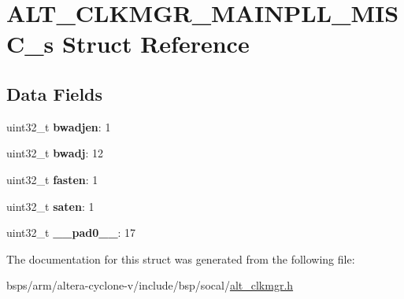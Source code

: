 \hypertarget{structALT__CLKMGR__MAINPLL__MISC__s}{}\section{A\+L\+T\+\_\+\+C\+L\+K\+M\+G\+R\+\_\+\+M\+A\+I\+N\+P\+L\+L\+\_\+\+M\+I\+S\+C\+\_\+s Struct Reference}
\label{structALT__CLKMGR__MAINPLL__MISC__s}
\subsection*{Data Fields}
\begin{DoxyCompactItemize}
\item 
\mbox{\label{structALT__CLKMGR__MAINPLL__MISC__s_af00102158989046b7ea0a47bbb01af68}} 
uint32\+\_\+t {\bfseries bwadjen}\+: 1
\item 
\mbox{\label{structALT__CLKMGR__MAINPLL__MISC__s_a2a95ef518713bbdc9fb0e35145386acd}} 
uint32\+\_\+t {\bfseries bwadj}\+: 12
\item 
\mbox{\label{structALT__CLKMGR__MAINPLL__MISC__s_a439807e43c377d436dc0ac96a2e34241}} 
uint32\+\_\+t {\bfseries fasten}\+: 1
\item 
\mbox{\label{structALT__CLKMGR__MAINPLL__MISC__s_aa76edaf98522bcc3795a1b8eb99ee1af}} 
uint32\+\_\+t {\bfseries saten}\+: 1
\item 
\mbox{\label{structALT__CLKMGR__MAINPLL__MISC__s_a9f8c4c25bc4139530c16e22001aa46e5}} 
uint32\+\_\+t {\bfseries \+\_\+\+\_\+pad0\+\_\+\+\_\+}\+: 17
\end{DoxyCompactItemize}


The documentation for this struct was generated from the following file\+:\begin{DoxyCompactItemize}
\item 
bsps/arm/altera-\/cyclone-\/v/include/bsp/socal/\mbox{\hyperlink{alt__clkmgr_8h}{alt\+\_\+clkmgr.\+h}}\end{DoxyCompactItemize}
